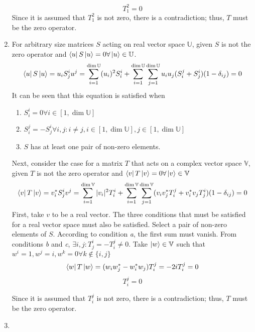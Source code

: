 \begin{sol}
\begin{enumerate}[label=\textbf{(\alph*)}]
\begin{equation}
	T_1^2=0
\end{equation} 
Since it is assumed that $T_1^2$ is not zero, there is a contradiction; thus, $T$ must be the zero operator.
\item
For arbitrary size matrices $S$ acting on real vector space $\mathbb U$, given $S$ is not the zero operator and $\bra uS\ket u=0\forall \ket u\in\mathbb U$.
\begin{equation}
	\bra uS\ket u=u_i S_j^i u^j=\sum_{i=1}^{\dim\mathbb U}(u_i)^2S_i^i+\sum_{i=1}^{\dim\mathbb U}\sum_{j=1}^{\dim\mathbb U}u_iu_j(S_i^j+S_j^i)(1-\delta_{ij})=0
\end{equation} It can be seen that this equation is satisfied when 
\begin{enumerate}

\item $S_i^i=0\forall i\in[1,\dim\mathbb U]$
\item $S_i^j=-S_j^i\forall i,j:i\neq j,i\in[1,\dim\mathbb U],j\in[1,\dim\mathbb U]$
\item $S$ has at least one pair of non-zero elements.
\end{enumerate}
Next, consider the case for a matrix $T$ that acts on a complex vector space $\mathbb V$, given $T$ is not the zero operator and $\bra vT\ket v=0\forall\ket v\in\mathbb V$
\begin{equation}
	\bra vT\ket v=v_i^* S_j^i v^j=\sum_{i=1}^{\dim\mathbb V}|v_i|^2T_i^i+\sum_{i=1}^{\dim\mathbb V}\sum_{j=1}^{\dim\mathbb V}(v_iv_j^*T_i^j+v_i^*v_jT_j^i)(1-\delta_{ij})=0
\end{equation}
First, take $v$ to be a real vector. The three conditions that must be satisfied for a real vector space must also be satisfied. Select a pair of non-zero elements of $S$. According to condition \textit{a}, the first sum must vanish. From conditions \textit{b} and \textit{c}, $\exists i,j:T_j^i=-T_i^j\neq 0$. Take $\ket w\in\mathbb V$ such that $w^i=1,w^j=i,w^k=0\forall k\notin\{i,j\}$
\begin{equation}
	\bra w T\ket w=(w_iw_j^*-w_i^*w_j)T_i^j=-2iT_i^j=0
\end{equation}
\begin{equation}
	T_i^j=0
\end{equation} 

Since it is assumed that $T_i^j$ is not zero, there is a contradiction; thus, $T$ must be the zero operator.
\item

\end{enumerate}
\end{sol}
